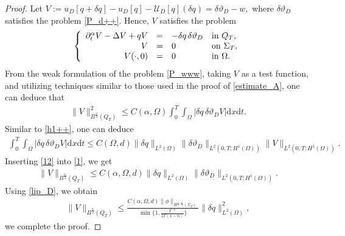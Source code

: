 \documentclass[a4paper,12pt,reqno,natbib]{amsart}
\newcommand{\dx} {\displaystyle\mathrm{d}x}
\newcommand{\dt} {\displaystyle\mathrm{d}t}
\begin{document}
\begin{proof}
Let $V:= u_D [q+\delta q]- u_D [q]- \mathcal{U}_{D}[q] (\delta q)= \delta \vartheta_{D} - w,$ where $\delta \vartheta_{D}$ satisfies the problem \eqref{P_d++}. Hence, $V$ satisfies the problem
\begin{eqnarray} \label{P_www}
\left\{
  \begin{array}{rcll}
    \partial_{t} ^{\alpha} V-\Delta V +q V&=& -\delta q \,\delta \vartheta_{D} &\hbox{in}\ Q_T, \\
    V &=&0 &\hbox{on}\  \Sigma_T, \\
    \displaystyle V (\cdot,0)&=&0  &\hbox{in}\ \Omega.
  \end{array}
\right.
\end{eqnarray}
From the weak formulation of the problem \eqref{P_www}, taking $V$ as a test function, and utilizing techniques similar to those used in the proof of \eqref{estimate_A}, one can deduce that
\begin{align} \label{1}
    \|V\|_{B^{\frac{\alpha}{2}}(Q_T)}^2 \leq C(\alpha,\Omega) \int_0^T\int_{\Omega}\Big|\delta q\, \delta \vartheta_{D} V\Big| \dx \dt.
\end{align}
Similar to \eqref{h1++}, one can deduce
\begin{align} \label{12}
\int_0^T\int_{\Omega}\Big|\delta q\, \delta \vartheta_{D} V\Big| \dx \dt
\leq C(\Omega,d)\|\delta q\|_{L^2(\Omega)}\|\delta \vartheta_{D}\|_{L^2(0,T;H^1(\Omega))}\|V\|_{L^2(0,T;H^1(\Omega))}.
\end{align}
Inserting \eqref{12} into \eqref{1}, we get
\begin{align*}
    \|V\|_{B^{\frac{\alpha}{2}}(Q_T)} \leq C(\alpha,\Omega,d)\|\delta q\|_{L^2(\Omega)}\|\delta \vartheta_{D}\|_{L^2(0,T;H^1(\Omega))}.
\end{align*}
Using \eqref{lip_D}, we obtain 
\begin{align*}
    \|V\|_{B^{\frac{\alpha}{2}}(Q_T)} \leq \frac{C(\alpha,\Omega,d)\|\phi\|_{H^{\frac{1}{2}, \frac{\alpha}{4} }(\Sigma_T)}}{\min\{1,\frac{T^{-\alpha}}{2\Gamma(1-\alpha)}\}}\|\delta q\|_{L^2(\Omega)}^2,
\end{align*}
we complete the proof.
\end{proof}
\end{document}
